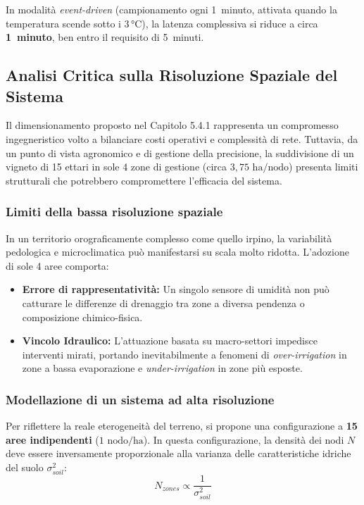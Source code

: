 \noindent In modalità \textit{event-driven} (campionamento ogni 1~minuto, attivata quando la temperatura scende sotto i 3\,°C), la latenza complessiva si riduce a circa \textbf{1~minuto}, ben entro il requisito di 5~minuti.

\subsection{Analisi Critica sulla Risoluzione Spaziale del Sistema}

Il dimensionamento proposto nel Capitolo 5.4.1 rappresenta un compromesso ingegneristico volto a bilanciare costi operativi e complessità di rete. Tuttavia, da un punto di vista agronomico e di gestione della precisione, la suddivisione di un vigneto di 15 ettari in sole 4 zone di gestione (circa $3,75\text{ ha/nodo}$) presenta limiti strutturali che potrebbero compromettere l'efficacia del sistema.

\subsubsection{Limiti della bassa risoluzione spaziale}
In un territorio orograficamente complesso come quello irpino, la variabilità pedologica e microclimatica può manifestarsi su scala molto ridotta. L'adozione di sole 4 aree comporta:
\begin{itemize}
	\item \textbf{Errore di rappresentatività:} Un singolo sensore di umidità non può catturare le differenze di drenaggio tra zone a diversa pendenza o composizione chimico-fisica.
	\item \textbf{Vincolo Idraulico:} L'attuazione basata su macro-settori impedisce interventi mirati, portando inevitabilmente a fenomeni di \textit{over-irrigation} in zone a bassa evaporazione e \textit{under-irrigation} in zone più esposte.
\end{itemize}

\subsubsection{Modellazione di un sistema ad alta risoluzione}
Per riflettere la reale eterogeneità del terreno, si propone una configurazione a \textbf{15 aree indipendenti} ($1\text{ nodo/ha}$). In questa configurazione, la densità dei nodi $N$ deve essere inversamente proporzionale alla varianza delle caratteristiche idriche del suolo $\sigma_{soil}^2$:
\begin{equation}
	N_{zones} \propto \frac{1}{\sigma_{soil}^2}
\end{equation}

